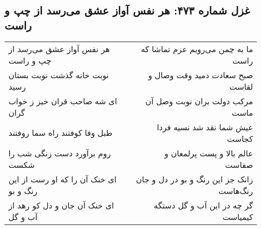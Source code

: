 \begin{center}
\section*{غزل شماره ۴۷۳: هر نفس آواز عشق می‌رسد از چپ و راست}
\label{sec:0473}
\begin{longtable}{l p{0.5cm} r}
هر نفس آواز عشق می‌رسد از چپ و راست
&&
ما به چمن می‌رویم عزم تماشا که راست
\\
نوبت خانه گذشت نوبت بستان رسید
&&
صبح سعادت دمید وقت وصال و لقاست
\\
ای شه صاحب قران خیز ز خواب گران
&&
مرکب دولت بران نوبت وصل آن ماست
\\
طبل وفا کوفتند راه سما روفتند
&&
عیش شما نقد شد نسیه فردا کجاست
\\
روم برآورد دست زنگی شب را شکست
&&
عالم بالا و پست پرلمعان و صفاست
\\
ای خنک آن را که او رست از این رنگ و بو
&&
زانک جز این رنگ و بو در دل و جان رنگ‌هاست
\\
ای خنک آن جان و دل کو رهد از آب و گل
&&
گر چه در این آب و گل دستگه کیمیاست
\\
\end{longtable}
\end{center}
